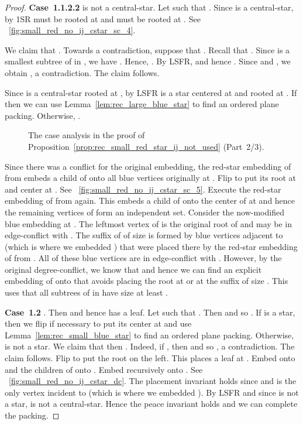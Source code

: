 \documentclass[11pt,a4paper,colorlinks=true,urlcolor=blue,citecolor=red]{article}
\theoremstyle{plain}
\newcommand{\case}[1]{\par\vspace{.5\baselineskip}\noindent\textbf{\sffamily Case~#1}}
\begin{document}
\begin{proof}
  \case{1.1.2.2}  is not a central-star. Let  such that
  . Since  is a central-star, by 1SR 
  must be rooted at  and  must be rooted at . See
  \figurename~\ref{fig:small_red_no_ij_cstar_sc_4}.

  We claim that . Towards a contradiction, suppose that
  . Recall that .
  Since  is a smallest subtree of  in , we have
  . Hence, . By LSFR,  and hence
  . Since
   and , we obtain
  , a
  contradiction. The claim follows.

  Since  is a central-star rooted at , by LSFR
   is a star centered at  and rooted at . If
   then we can use Lemma~\ref{lem:rec_large_blue_star} to find
  an ordered plane packing. Otherwise, .

  \begin{figure}[thbp]
    \centering {}\hfil {}\hfil {}\hfil \caption{The case analysis in the proof of
      Proposition~\ref{prop:rec_small_red_star_ij_not_used} (Part~2/3).}
  \end{figure}

  Since there was a conflict for the original embedding, the
  red-star embedding of  from  embeds a child of  onto
  all blue vertices originally at . Flip  to put its root
  at  and center at . See
  \figurename~\ref{fig:small_red_no_ij_cstar_sc_5}. Execute the
  red-star embedding of  from  again. This embeds a child
  of  onto the center of  at  and hence the remaining
  vertices of  form an independent set. Consider the
  now-modified blue embedding at . The leftmost vertex of
   is the original root of  and may be in
  edge-conflict with . The suffix of  of size
   is formed by blue vertices adjacent to  (which
  is where we embedded ) that were placed there by the
  red-star embedding of  from . All of these blue vertices
  are in edge-conflict with . However, by the original
  degree-conflict, we know that  and hence we can
  find an explicit embedding of  onto  that avoids placing
  the root at  or at the suffix of size . This uses that all
  subtrees of  in  have size at least .

  \case{1.2} . Then
   and hence
   has a leaf. Let  such that . Then
   and so . If  is a star, then we flip
   if necessary to put its center at  and use
  Lemma~\ref{lem:rec_small_blue_star} to find an ordered plane packing.
  Otherwise,  is not a star. We claim that then . Indeed,
  if , then  and so
  , a contradiction.
  The claim follows. Flip  to put the root on the left. This
  places a leaf at . Embed  onto  and the children of  onto
  . Embed  recursively onto . See
  \figurename~\ref{fig:small_red_no_ij_cstar_dc}. The placement
  invariant holds since  and  is the only vertex incident to 
  (which is where we embedded ).  By LSFR and since  is not a
  star,  is not a central-star. Hence the peace
  invariant holds and we can complete the packing.


\end{proof}
\end{document}

